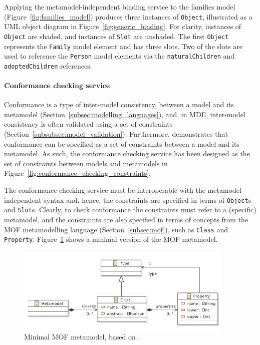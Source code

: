 Applying the metamodel-independent binding service to the families model (Figure~\ref{fig:families_model}) produces three instances of \texttt{Ob\-je\-ct}, illustrated as a UML object diagram in Figure~\ref{fig:generic_binding}. For clarity, instances of \texttt{Ob\-je\-ct} are shaded, and instances of \texttt{Sl\-ot} are unshaded. The first \texttt{Ob\-je\-ct} represents the \texttt{Fa\-mi\-ly} model element and has three slots. Two of the slots are used to reference the \texttt{Pe\-rs\-on} model elements via the \texttt{na\-tu\-r\-alCh\-il\-dr\-en} and \texttt{ad\-op\-t\-edCh\-il\-dr\-en} references. 


\paragraph{Conformance checking service} Conformance is a type of inter-model consistency, between a model and its metamodel (Section~\ref{subsec:modelling_languages}), and, in MDE, inter-model consistency is often validated using a set of constraints (Section~\ref{subsubsec:model_validation}). Furthermore, \cite{paige07metamodel} demonstrates that conformance can be specified as a set of constraints between a model and its metamodel. As such, the conformance checking service has been designed as the set of constraints between models and metamodels in Figure~\ref{fig:conformance_checking_constraints}.

The conformance checking service must be interoperable with the me\-ta\-mo\-del-ind\-ep\-en\-de\-nt syntax and, hence, the constraints are specified in terms of \texttt{Ob\-je\-ct}s and \texttt{Sl\-ot}s. Clearly, to check conformance the constraints must refer to a (specific) metamodel, and the constraints are also specified in terms of concepts from the MOF metamodelling language (Section~\ref{subsec:mof}), such as \texttt{Class} and \texttt{Property}. Figure~\ref{fig:minimal_mof} shows a minimal version of the MOF metamodel.

\begin{figure}[p]
  \centering
  \includegraphics[width=10.5cm]{5.Implementation/images/minimal_mof.pdf}
  \caption{Minimal MOF metamodel, based on \cite{mof}.}
  \label{fig:minimal_mof}
\end{figure}

